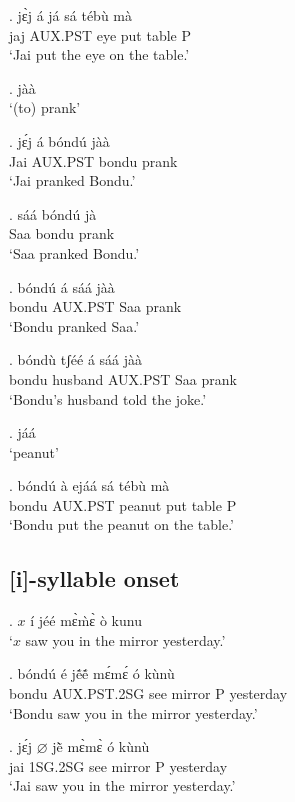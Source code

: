 \documentclass{assets/fieldnotes}
\begin{document}
\exg. jɛ̀j á já sá tébù mà \\
jaj AUX.PST eye put table P \\
`Jai put the eye on the table.'

\ex. jàà \\
`(to) prank'

\exg. jɛ́j á bóndú jàà \\
Jai AUX.PST bondu prank \\
`Jai pranked Bondu.'


\exg. sáá bóndú jà \\
Saa bondu prank \\
`Saa pranked Bondu.'

\exg. bóndú á sáá jàà \\
bondu AUX.PST Saa prank \\
`Bondu pranked Saa.'

\exg. bóndù tʃéé á sáá jàà \\
bondu husband AUX.PST Saa prank \\
`Bondu's husband told the joke.'

\ex. jáá \\
`peanut'


\exg. bóndú à ejáá sá tébù mà \\
bondu AUX.PST peanut put table P \\
`Bondu put the peanut on the table.'


\subsection{[i]-syllable onset}


\ex. $x$ í jéé mɛ̀m̀ɛ̀ ò kunu \\
`$x$ saw you in the mirror yesterday.'

\exg. bóndú é jẽ́ẽ́ mɛ́mɛ́ ó kùnù \\
bondu AUX.PST.2SG see mirror P yesterday \\
`Bondu saw you in the mirror yesterday.'


\exg. jɛ́j $\varnothing$ jẽ̀ mɛ̀mɛ̀ ó kùnù \\
jai 1SG.2SG see mirror P yesterday \\
`Jai saw you in the mirror yesterday.'
\end{document}
